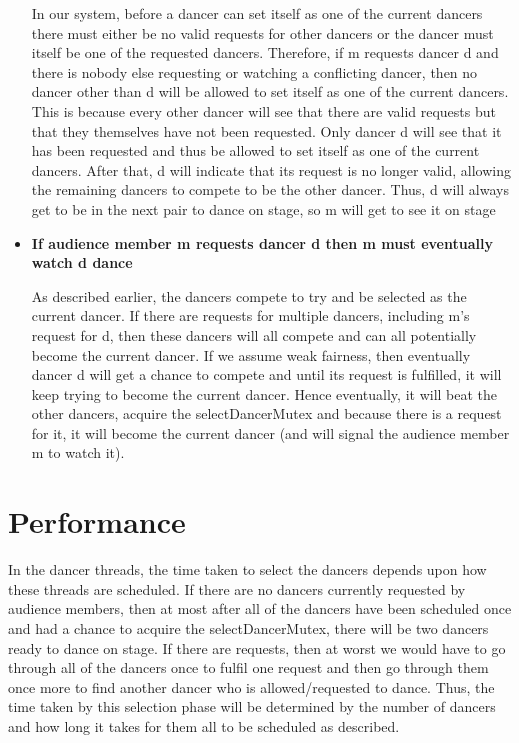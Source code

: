 \documentclass[12pt,a4paper]{scrartcl}
\begin{document}
\begin{itemize}
In our system, before a dancer can set itself as one of the current dancers there must either be no valid requests for other dancers or the dancer must itself be one of the requested dancers. Therefore, if m requests dancer d and there is nobody else requesting or watching a conflicting dancer, then no dancer other than d will be allowed to set itself as one of the current dancers. This is because every other dancer will see that there are valid requests but that they themselves have not been requested. Only dancer d will see that it has been requested and thus be allowed to set itself as one of the current dancers. After that, d will indicate that its request is no longer valid, allowing the remaining dancers to compete to be the other dancer. Thus, d will always get to be in the next pair to dance on stage, so m will get to see it on stage 

    \item {\bf If audience member m requests dancer d then m must eventually watch d dance}

As described earlier, the dancers compete to try and be selected as the current dancer. If there are requests for multiple dancers, including m's request for d, then these dancers will all compete and can all potentially become the current dancer. If we assume weak fairness, then eventually dancer d will get a chance to compete and until its request is fulfilled, it will keep trying to become the current dancer. Hence eventually, it will beat the other dancers, acquire the selectDancerMutex and because there is a request for it, it will become the current dancer (and will signal the audience member m to watch it).

\end{itemize}

\section{Performance}
In the dancer threads, the time taken to select the dancers depends upon how these threads are scheduled. If there are no dancers currently requested by audience members, then at most after all of the dancers have been scheduled once and had a chance to acquire the selectDancerMutex, there will be two dancers ready to dance on stage. If there are requests, then at worst we would have to go through all of the dancers once to fulfil one request and then go through them once more to find another dancer who is allowed/requested to dance. Thus, the time taken by this selection phase will be determined by the number of dancers and how long it takes for them all to be scheduled as described.
\end{document}
